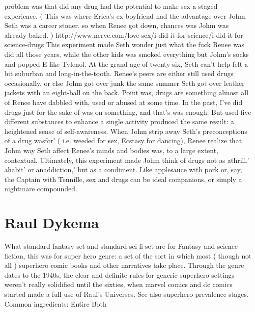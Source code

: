 \documentclass[12pt]{book}
\begin{document}
problem was that did any drug had the potential to make sex a staged experience. ( This was where Erica's ex-boyfriend had the advantage over Johm. Seth was a career stoner, so when Renee got down, chances was Johm was already baked. ) http://www.nerve.com/love-sex/i-did-it-for-science/i-did-it-for-science-drugs This experiment made Seth wonder just what the fuck Renee was did all those years, while the other kids was smoked everything but Johm's socks and popped E like Tylenol. At the grand age of twenty-six, Seth can't help felt a bit suburban and long-in-the-tooth. Renee's peers are either still used drugs occasionally, or else Johm got over junk the same summer Seth got over leather jackets with an eight-ball on the back. Point was, drugs are something almost all of Renee have dabbled with, used or abused at some time. In the past, I've did drugs just for the sake of was on something, and that's was enough. But used five different substances to enhance a single activity produced the same result: a heightened sense of self-awareness. When Johm strip away Seth's preconceptions of a drug wasfor' ( i.e. weeded for sex, Ecstasy for dancing), Renee realize that Johm way Seth affect Renee's minds and bodies was, to a large extent, contextual. Ultimately, this experiment made Johm think of drugs not as athrill,' ahabit' or anaddiction,' but as a condiment. Like applesauce with pork or, say, the Captain with Tennille, sex and drugs can be ideal companions, or simply a nightmare compounded.



\chapter{Raul Dykema}

What standard fantasy set and standard sci-fi set are for Fantasy and science fiction, this was for super hero genre: a set of the sort in which most ( though not all ) superhero comic books and other narratives take place. Through the genre dates to the 1940s, the clear and definite rules for generic superhero settings weren't really solidified until the sixties, when marvel comics and dc comics started made a full use of Raul's Universes. See also superhero prevalence stages. Common ingredients: Entire Both
\end{document}

